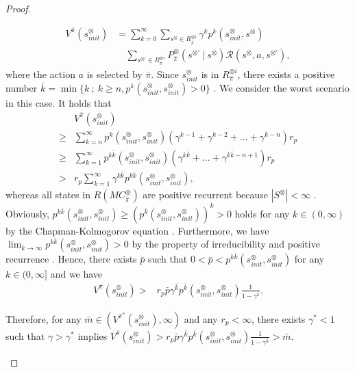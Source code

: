 \documentclass[letterpaper, 10 pt, conference]{ieeeconf}  %
\begin{document}
\begin{proof}
\begin{enumerate}
    \begin{align}
      V^{\bar{\pi}}(s^{\otimes}_{init})
       &= \sum_{k=0}^{\infty} \sum_{s^{\otimes} \in R^{\otimes i}_{\bar{\pi}}} \gamma^k p^k(s^{\otimes}_{init}, s^{\otimes}) \nonumber \\
       & \quad \sum_{s^{\otimes \prime} \in R^{\otimes i}_{\bar{\pi}}}  P^{\otimes}_{\bar{\pi}}(s^{\otimes \prime}\ |\ s^{\otimes}) \mathcal{R}(s^{\otimes}, a, s^{\otimes \prime}), \nonumber
    \end{align}
    where the action $a$ is selected by $\bar{\pi}$. Since $s^{\otimes}_{init}$ is in $R^{\otimes i}_{\bar{\pi}}$, there exists a positive number $\bar{k} = \min \{ k\ ;\ k \geq n, p^{k}(s^{\otimes}_{init}, s^{\otimes}_{init}) > 0 \}$ \cite{ESS}. We consider the worst scenario in this case. It holds that
    \begin{align}
      &V^{\bar{\pi}}(s^{\otimes}_{init}) \nonumber \\
       \geq & \sum_{k=n}^{\infty} p^{k}(s^{\otimes}_{init}, s^{\otimes}_{init})(\gamma^{k - 1} + \gamma^{k - 2} +...+ \gamma^{k - n})r_p \nonumber \\
       \geq & \sum_{k=1}^{\infty} p^{k \bar{k}}(s^{\otimes}_{init}, s^{\otimes}_{init}) (\gamma^{k \bar{k}} +...+ \gamma^{k \bar{k} - n + 1})r_p \nonumber \\
       > & r_p \sum_{k=1}^{\infty} \gamma^{k \bar{k}} p^{k \bar{k}}(s^{\otimes}_{init}, s^{\otimes}_{init}), \nonumber
    \end{align}
whereas all states in $R(MC^{\otimes}_{\bar{\pi}})$ are positive recurrent because $|S^{\otimes}| < \infty$ \cite{ISP}. Obviously, $p^{k \bar{k}}(s^{\otimes}_{init}, s^{\otimes}_{init}) \geq (p^{\bar{k}}(s^{\otimes}_{init}, s^{\otimes}_{init}))^k > 0$ holds for any $k \in (0, \infty)$ by the Chapman-Kolmogorov equation \cite{ESS}. Furthermore, we have $\lim_{k \rightarrow \infty} p^{k \bar{k}}(s^{\otimes}_{init}, s^{\otimes}_{init}) > 0$ by the property of irreducibility and positive recurrence \cite{SM}. Hence, there exists $\bar{p}$ such that $0<\bar{p}<p^{k \bar{k}}(s^{\otimes}_{init}, s^{\otimes}_{init})$ for any $k \in (0, \infty]$ and we have
    \begin{align}
       V^{\bar{\pi}}(s^{\otimes}_{init}) > & r_p \bar{p} \gamma^{\bar{k}} p^{\bar{k}}(s^{\otimes}_{init},s^{\otimes}_{init}) \frac{1}{ 1 - \gamma^{\bar{k}} }. \nonumber
    \end{align}

    Therefore, for any $\bar{m} \in (V^{\pi^{\ast}}(s^{\otimes}_{init}), \infty)$ and any $r_p < \infty$, there exists $\gamma^{\ast}<1$ such that $\gamma > \gamma^{\ast}$ implies $V^{\bar{\pi}}(s^{\otimes}_{init}) > r_p \bar{p} \gamma^{\bar{k}} p^{\bar{k}}(s^{\otimes}_{init},s^{\otimes}_{init}) \frac{1}{ 1 - \gamma^{\bar{k}} } > \bar{m}.$


\end{enumerate}
\end{proof}
\end{document}
